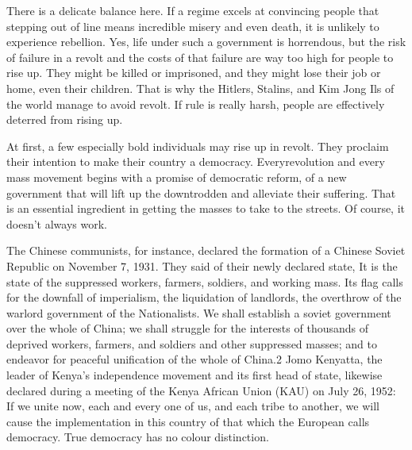 \documentclass[10pt]{article}
\begin{document}
{\large There is a delicate balance here. If a regime excels at convincing
people that stepping out of line means incredible misery and even death, it is
unlikely to experience rebellion. Yes, life under such a government is
horrendous, but the risk of failure in a revolt and the costs of that failure are
way too high for people to rise up. They might be killed or imprisoned, and they
might lose their job or home, even their children. That is why the Hitlers,
Stalins, and Kim Jong Ils of the world manage to avoid revolt. If rule is really
harsh, people are effectively deterred from rising up.}

{\large At first, a few especially bold individuals may rise up in revolt. They
proclaim their intention to make their country a democracy. Everyrevolution and
every mass movement begins with a promise of democratic reform, of a new
government that will lift up the downtrodden and alleviate their suffering. That
is an essential ingredient in getting the masses to take to the streets. Of
course, it doesn't always work.}

{\large The Chinese communists, for instance, declared the formation of a
Chinese Soviet Republic on November 7, 1931. They said of their newly declared
state, It is the state of the suppressed workers, farmers, soldiers, and working
mass. Its flag calls for the downfall of imperialism, the liquidation of
landlords, the overthrow of the warlord government of the Nationalists. We shall
establish a soviet government over the whole of China; we shall struggle for the
interests of thousands of deprived workers, farmers, and soldiers and other
suppressed masses; and to endeavor for peaceful unification of the whole of
China.2 Jomo Kenyatta, the leader of Kenya's independence movement and its first
head of state, likewise declared during a meeting of the Kenya African Union
(KAU) on July 26, 1952: If we unite now, each and every one of us, and each tribe
to another, we will cause the implementation in this country of that which the
European calls democracy. True democracy has no colour distinction.}
\end{document}
